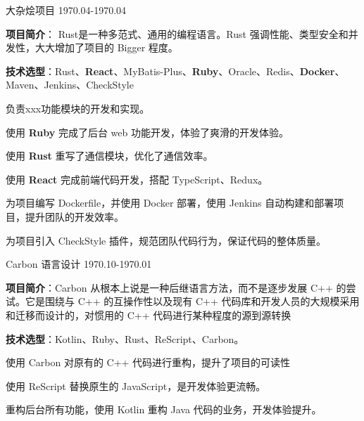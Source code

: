

\begin{cventries}

  \cventryjob
    {} %
    {大杂烩项目} %
    {1970.04-1970.04} %
    {} %
    {
      \begin{cvitems} %
        \item {\textbf{项目简介}：
        Rust是一种多范式、通用的编程语言。Rust 强调性能、类型安全和并发性，大大增加了项目的 Bigger 程度。}
        \item {\textbf{技术选型}：Rust、\textbf{React}、MyBatis-Plus、\textbf{Ruby}、Oracle、Redis、\textbf{Docker}、Maven、Jenkins、CheckStyle}
        \item {负责xxx功能模块的开发和实现。}
        \item {使用 \textbf{Ruby} 完成了后台 web 功能开发，体验了爽滑的开发体验。}
        \item {使用 \textbf{Rust} 重写了通信模块，优化了通信效率。}
        \item {使用 \textbf{React} 完成前端代码开发，搭配 TypeScript、Redux。}
        \item {为项目编写 Dockerfile，并使用 Docker 部署，使用 Jenkins 自动构建和部署项目，提升团队的开发效率。}
        \item {为项目引入 CheckStyle 插件，规范团队代码行为，保证代码的整体质量。}
      \end{cvitems}
    }

  \cventryjob
    {} %
    {Carbon 语言设计} %
    {1970.10-1970.01} %
    {} %
    {
      \begin{cvitems} %
        \item {\textbf{项目简介}：Carbon 从根本上说是一种后继语言方法，而不是逐步发展 C++ 的尝试。它是围绕与 C++ 的互操作性以及现有 C++ 代码库和开发人员的大规模采用和迁移而设计的，对惯用的 C++ 代码进行某种程度的源到源转换}
        \item {\textbf{技术选型}：Kotlin、Ruby、Rust、ReScript、Carbon。}
        \item {使用 Carbon 对原有的 C++ 代码进行重构，提升了项目的可读性}
        \item {使用 ReScript 替换原生的 JavaScript，是开发体验更流畅。}
        \item {重构后台所有功能，使用 Kotlin 重构 Java 代码的业务，开发体验提升。}
      \end{cvitems}
    }
    

\end{cventries}

